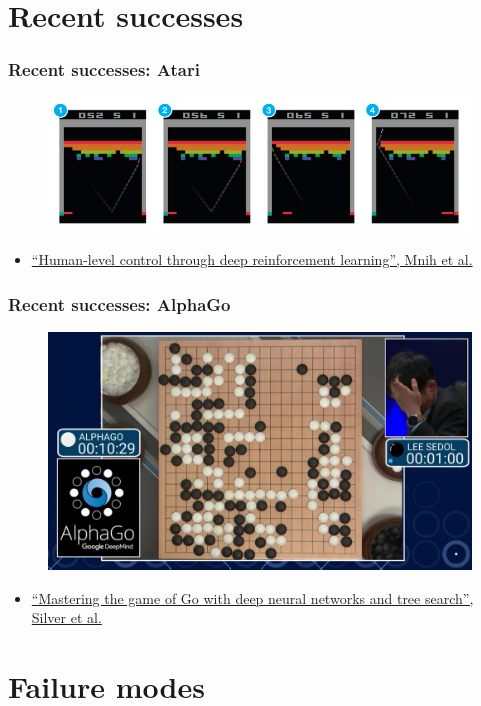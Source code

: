 \documentclass{beamer}
\begin{document}
\section{Recent successes}

\begin{frame}
  \frametitle{Recent successes: Atari}

  \begin{figure}
    \includegraphics[width=0.6\linewidth]{img/atari.png}
  \end{figure}
  \begin{itemize}
    \item \href{http://www.nature.com/nature/journal/v518/n7540/full/nature14236.html}{``Human-level control through deep reinforcement learning'', Mnih et al.}
  \end{itemize}
\end{frame}

\begin{frame}
  \frametitle{Recent successes: AlphaGo}

  \begin{figure}
    \includegraphics[width=0.6\linewidth]{img/alphago.jpg}
  \end{figure}
  \begin{itemize}
    \item \href{http://www.nature.com/nature/journal/v518/n7540/full/nature14236.html}{``Mastering the game of Go with deep neural networks and tree search'', Silver et al.}
  \end{itemize}
\end{frame}

\section{Failure modes}
\end{document}
